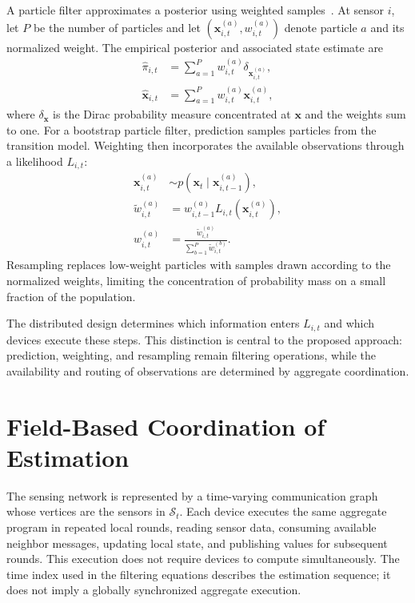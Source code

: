 A particle filter approximates a posterior using 
 weighted samples~\cite{DBLP:journals/tsp/ArulampalamMGC02}.
%
At sensor $i$, 
 let $P$ be the number of particles 
 and let $(\mathbf{x}_{i,t}^{(a)},w_{i,t}^{(a)})$ denote particle $a$ 
 and its normalized weight.
%
The empirical posterior and associated state estimate are
\begin{align}
    \widehat{\pi}_{i,t}
    &= \sum_{a=1}^{P} w_{i,t}^{(a)}
       \delta_{\mathbf{x}_{i,t}^{(a)}},
       \label{eq:dpf-empirical-posterior}\\
    \widehat{\mathbf{x}}_{i,t}
    &= \sum_{a=1}^{P} w_{i,t}^{(a)}\mathbf{x}_{i,t}^{(a)},
       \label{eq:dpf-state-estimate}
\end{align}
where $\delta_{\mathbf{x}}$ is the Dirac probability measure concentrated 
 at $\mathbf{x}$ and the weights sum to one.
%
For a bootstrap particle filter, 
 prediction samples particles from the transition model.
%
Weighting then incorporates the available observations through a likelihood $L_{i,t}$:
\begin{align}
    \mathbf{x}_{i,t}^{(a)}
    &\sim p(\mathbf{x}_t \mid \mathbf{x}_{i,t-1}^{(a)}),
       \label{eq:dpf-prediction}\\
    \widetilde{w}_{i,t}^{(a)}
    &= w_{i,t-1}^{(a)} L_{i,t}(\mathbf{x}_{i,t}^{(a)}),
       \label{eq:dpf-weighting}\\
    w_{i,t}^{(a)}
    &= \frac{\widetilde{w}_{i,t}^{(a)}}
            {\sum_{b=1}^{P}\widetilde{w}_{i,t}^{(b)}}.
       \label{eq:dpf-normalization}
\end{align}
%
Resampling replaces low-weight particles with samples 
 drawn according to the normalized weights, 
 limiting the concentration of probability mass on a small fraction of the population.

The distributed design determines which information enters $L_{i,t}$ 
 and which devices execute these steps.
%
This distinction is central to the proposed approach: 
 prediction, weighting, and resampling remain filtering operations, 
 while the availability and routing of observations are determined 
 by aggregate coordination.

\section{Field-Based Coordination of Estimation}
\label{sec:dpf-approach}

The sensing network is represented by a time-varying communication graph 
 whose vertices are the sensors in $\mathcal{S}_t$.
%
Each device executes the same aggregate program in repeated local rounds, 
 reading sensor data, consuming available neighbor messages, updating local state, 
 and publishing values for subsequent rounds.
%
This execution does not require devices to compute simultaneously.
%
The time index used in the filtering equations describes the estimation sequence; 
 it does not imply a globally synchronized aggregate execution.

